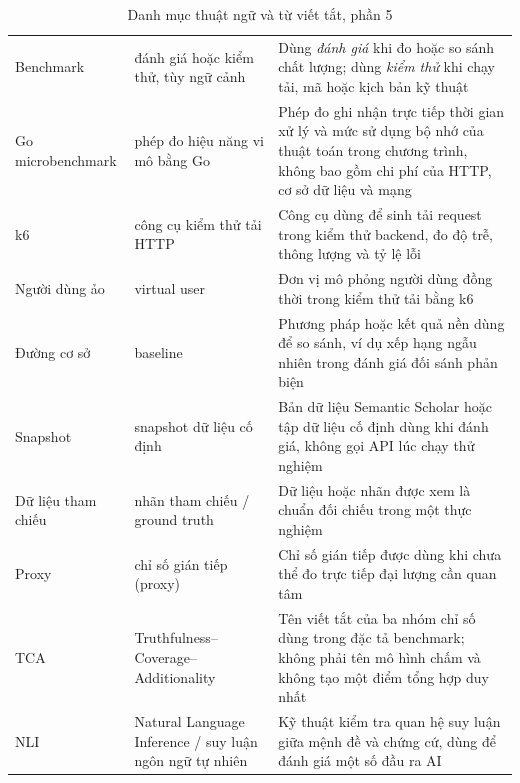\begingroup
\setlength{\tabcolsep}{2pt}
\renewcommand{\arraystretch}{1.2}
\begin{longtable}{|C{0.16\textwidth}|P{0.22\textwidth}|P{0.55\textwidth}|}  \caption{Danh mục thuật ngữ và từ viết tắt, phần 5}\\
  \hline
       &        &     \\ \hline
  Benchmark     &     đánh giá hoặc kiểm thử, tùy ngữ cảnh     &     Dùng \textit{đánh giá} khi đo hoặc so sánh chất lượng; dùng \textit{kiểm thử} khi chạy tải, mã hoặc kịch bản kỹ thuật \\ \hline
  Go microbenchmark      &      phép đo hiệu năng vi mô bằng Go      &      Phép đo ghi nhận trực tiếp thời gian xử lý và mức sử dụng bộ nhớ của thuật toán trong chương trình, không bao gồm chi phí của HTTP, cơ sở dữ liệu và mạng \\ \hline
  k6     &     công cụ kiểm thử tải HTTP     &     Công cụ dùng để sinh tải request trong kiểm thử backend, đo độ trễ, thông lượng và tỷ lệ lỗi \\ \hline
  Người dùng ảo      &      virtual user      &      Đơn vị mô phỏng người dùng đồng thời trong kiểm thử tải bằng k6 \\ \hline
  Đường cơ sở     &     baseline     &     Phương pháp hoặc kết quả nền dùng để so sánh, ví dụ xếp hạng ngẫu nhiên trong đánh giá đối sánh phản biện \\ \hline
  Snapshot      &      snapshot dữ liệu cố định      &      Bản dữ liệu Semantic Scholar hoặc tập dữ liệu cố định dùng khi đánh giá, không gọi API lúc chạy thử nghiệm \\ \hline
  Dữ liệu tham chiếu     &     nhãn tham chiếu / ground truth     &     Dữ liệu hoặc nhãn được xem là chuẩn đối chiếu trong một thực nghiệm \\ \hline
  Proxy      &      chỉ số gián tiếp (proxy)      &      Chỉ số gián tiếp được dùng khi chưa thể đo trực tiếp đại lượng cần quan tâm \\ \hline
  TCA     &     Truthfulness--\allowbreak Coverage--\allowbreak Additionality     &     Tên viết tắt của ba nhóm chỉ số dùng trong đặc tả benchmark; không phải tên mô hình chấm và không tạo một điểm tổng hợp duy nhất \\ \hline
  NLI      &      Natural Language Inference / suy luận ngôn ngữ tự nhiên      &      Kỹ thuật kiểm tra quan hệ suy luận giữa mệnh đề và chứng cứ, dùng để đánh giá một số đầu ra AI \\ \hline

\end{longtable}
